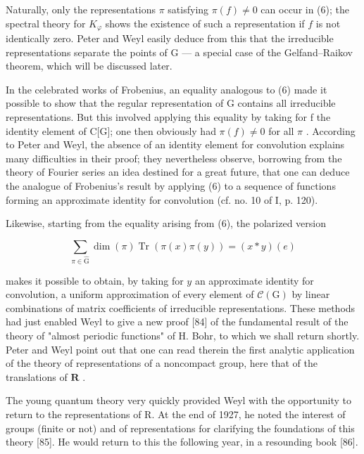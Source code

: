 Naturally, only the representations \(\pi\) satisfying \(\pi(f) \neq 0\) can occur in (6); the spectral theory for \(K_{\varphi}\) shows the existence of such a representation if \(f\) is not identically zero. Peter and Weyl easily deduce from this that the irreducible representations separate the points of G --- a special case of the Gelfand--Raikov theorem, which will be discussed later.

In the celebrated works of Frobenius, an equality analogous to (6) made it possible to show that the regular representation of G contains all irreducible representations. But this involved applying this equality by taking for f the identity element of C{[}G{]}; one then obviously had \(\pi(f) \neq 0\) for all \(\pi\) . According to Peter and Weyl, the absence of an identity element for convolution explains many difficulties in their proof; they nevertheless observe, borrowing from the theory of Fourier series an idea destined for a great future, that one can deduce the analogue of Frobenius's result by applying (6) to a sequence of functions forming an approximate identity for convolution (cf. no. 10 of I, p. 120).

Likewise, starting from the equality arising from (6), the polarized version

\[
\sum_ {\pi \in \widehat {\mathrm{G}}} \dim (\pi) \operatorname{Tr} (\pi (x) \pi (y)) = (x * y) (e)\tag{7}
\]

makes it possible to obtain, by taking for \(y\) an approximate identity for convolution, a uniform approximation of every element of \(\mathcal{C}(\mathrm{G})\) by linear combinations of matrix coefficients of irreducible representations. These methods had just enabled Weyl to give a new proof {[}84{]} of the fundamental result of the theory of "almost periodic functions" of H. Bohr, to which we shall return shortly. Peter and Weyl point out that one can read therein the first analytic application of the theory of representations of a noncompact group, here that of the translations of \(\mathbf{R}\) .

The young quantum theory very quickly provided Weyl with the opportunity to return to the representations of R. At the end of 1927, he noted the interest of groups (finite or not) and of representations for clarifying the foundations of this theory {[}85{]}. He would return to this the following year, in a resounding book {[}86{]}.

